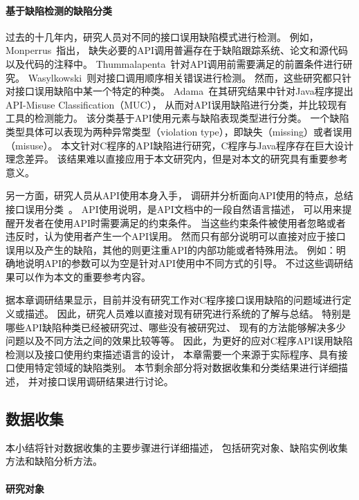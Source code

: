 \paragraph{基于缺陷检测的缺陷分类}
过去的十几年内，研究人员对不同的接口误用缺陷模式进行检测。
例如，Monperrus~\cite{13-tosem-missing-call}指出，
缺失必要的API调用普遍存在于缺陷跟踪系统、论文和源代码以及代码的注释中。
Thummalapenta~\cite{09-icse-exception}针对API调用前需要满足的前置条件进行研究。
Wasylkowski~\cite{07-fse-object}则对接口调用顺序相关错误进行检测。
然而，这些研究都只针对接口误用缺陷中某一个特定的种类。
Adama~\cite{survey18}在其研究结果中针对Java程序提出API-Misuse Classification（MUC），
从而对API误用缺陷进行分类，并比较现有工具的检测能力。
该分类基于API使用元素与缺陷表现类型进行分类。
一个缺陷类型具体可以表现为两种异常类型（violation type），即缺失（missing）或者误用（misuse）。
本文针对C程序的API缺陷进行研究，C程序与Java程序存在巨大设计理念差异。
该结果难以直接应用于本文研究内，但是对本文的研究具有重要参考意义。

另一方面，研究人员从API使用本身入手，
调研并分析面向API使用的特点，总结接口误用分类~\cite{09-icse-doc,12-ese-directive}。
API使用说明，是API文档中的一段自然语言描述，
可以用来提醒开发者在使用API时需要满足的约束条件。
当这些约束条件被使用者忽略或者违反时，认为使用者产生一个API误用。
然而只有部分说明可以直接对应于接口误用以及产生的缺陷，其他的则更注重API的内部功能或者特殊用法。
例如：明确地说明API的参数可以为空是针对API使用中不同方式的引导。
不过这些调研结果可以作为本文的重要参考内容。


据本章调研结果显示，目前并没有研究工作对C程序接口误用缺陷的问题域进行定义或描述。
因此，研究人员难以直接对现有研究进行系统的了解与总结。
特别是哪些API缺陷种类已经被研究过、哪些没有被研究过、
现有的方法能够解决多少问题以及不同方法之间的效果比较等等。
因此，为更好的应对C程序API误用缺陷检测以及接口使用约束描述语言的设计，
本章需要一个来源于实际程序、具有接口使用特定领域的缺陷类别。
本节剩余部分将对数据收集和分类结果进行详细描述，
并对接口误用调研结果进行讨论。

\subsection{数据收集}
本小结将针对数据收集的主要步骤进行详细描述，
包括研究对象、缺陷实例收集方法和缺陷分析方法。

\paragraph{研究对象}


